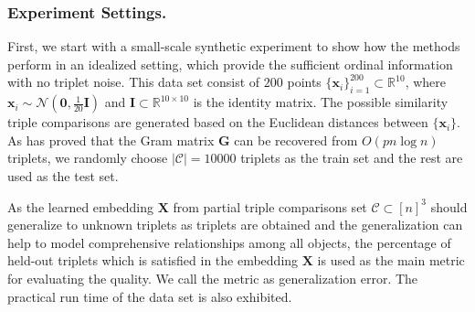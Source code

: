 \documentclass[letterpaper]{article}
\begin{document}
		\subsubsection{Experiment Settings.}
		First, we start with a small-scale synthetic experiment to show how the methods perform in an idealized setting, which provide the sufficient ordinal information with no triplet noise. This data set consist of $200$ points $\{\mathbf{x}_i\}_{i=1}^{200}\subset\mathbb{R}^{10}$, where $\mathbf{x}_i\sim\mathcal{N}(\mathbf{0}, \frac{1}{20}\mathbf{I})$ and $\mathbf{I}\subset\mathbb{R}^{10\times 10}$ is the identity matrix. The possible similarity triple comparisons are generated based on the Euclidean distances between $\{\mathbf{x}_i\}$. As \cite{2016arXiv160607081J} has proved that the Gram matrix $\mathbf{G}$ can be recovered from $O(pn\log n)$ triplets, we randomly choose $|\mathcal{C}|=10000$ triplets as the train set and the rest are used as the test set.

		As the learned embedding $\mathbf{X}$ from partial triple comparisons set $\mathcal{C}\subset[n]^3$ should generalize to unknown triplets as triplets are obtained and the generalization can help to model comprehensive relationships among all objects, the percentage of held-out triplets which is satisfied in the embedding $\mathbf{X}$ is used as the main metric for evaluating the quality. We call the metric as generalization error. The practical run time of the data set is also exhibited. 
\end{document}

